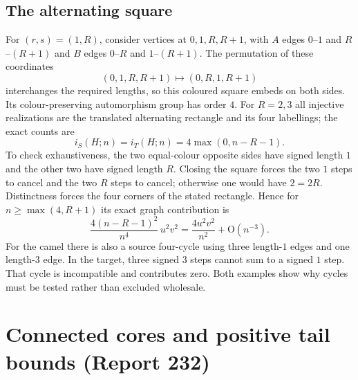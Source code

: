 \documentclass[11pt]{article}
\numberwithin{equation}{section}
\theoremstyle{definition}
\theoremstyle{remark}
\theoremstyle{definition}
\newcommand{\fall}[2]{{#1}^{\underline{#2}}}
\newcommand{\bigO}{\mathrm O}
\begin{document}
\subsection{The alternating square}
\label{spf:cg:sec:square}
For $(r,s)=(1,R)$, consider vertices at $0,1,R,R+1$, with $A$ edges
$0$--$1$ and $R$--$(R+1)$ and $B$ edges $0$--$R$ and $1$--$(R+1)$.
The permutation of these coordinates
\[
 (0,1,R,R+1)\longmapsto(0,R,1,R+1)
\]
interchanges the required lengths, so this coloured square embeds on both
sides. Its colour-preserving automorphism group has order $4$. For
$R=2,3$ all injective realizations are the translated alternating rectangle
and its four labellings; the exact counts are
\begin{equation}
 i_S(H;n)=i_T(H;n)=4\max(0,n-R-1).
 \label{spf:cg:eq:squarecount}
\end{equation}
To check exhaustiveness, the two equal-colour opposite sides have signed
length $1$ and the other two have signed length $R$. Closing the square forces
the two $1$ steps to cancel and the two $R$ steps to cancel; otherwise one
would have $2=2R$. Distinctness forces the four corners of the stated
rectangle. Hence for $n\ge\max(4,R+1)$ its exact graph contribution is
\begin{equation}
 \frac{4(n-R-1)^2}{\fall n4}\,u^2v^2
       =\frac{4u^2v^2}{n^2}+\bigO(n^{-3}).
 \label{spf:cg:eq:squareterm}
\end{equation}
For the camel there is also a source four-cycle using three length-$1$ edges
and one length-$3$ edge. In the target, three signed $3$ steps cannot sum to
a signed $1$ step. That cycle is incompatible and contributes zero. Both
examples show why cycles must be tested rather than excluded wholesale.

\section{Connected cores and positive tail bounds (Report 232)}
\label{spf:cg:sec:cores}
\end{document}
